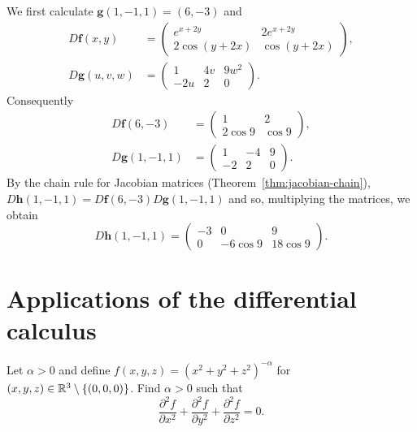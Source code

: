 \begin{solution}
    We first calculate \(\mathbf{g}(1,-1,1) = (6,-3)\) and
    \[
        \begin{aligned}
            D\mathbf{f}(x,y)   & =
            \begin{pmatrix}
                e^{x+2y}     & 2 e^{x+2y} \\
                2 \cos(y+2x) & \cos(y+2x)
            \end{pmatrix}, \\
            D\mathbf{g}(u,v,w) & =
            \begin{pmatrix}
                1   & 4v & 9w^2 \\
                -2u & 2  & 0
            \end{pmatrix}.
        \end{aligned}
    \]
    Consequently
    \[
        \begin{aligned}
            D\mathbf{f}(6,-3)   & =
            \begin{pmatrix}
                1        & 2      \\
                2 \cos 9 & \cos 9
            \end{pmatrix}, \\
            D\mathbf{g}(1,-1,1) & =
            \begin{pmatrix}
                1  & -4 & 9 \\
                -2 & 2  & 0
            \end{pmatrix}.
        \end{aligned}
    \]
    By the chain rule for Jacobian matrices (Theorem~\ref{thm:jacobian-chain}),
    \( D\mathbf{h}(1,-1,1) = D\mathbf{f}(6,-3)  D\mathbf{g}(1,-1,1) \)
    and so, multiplying the matrices, we obtain
    $$D\mathbf{h}(1,-1,1) =
        \begin{pmatrix}
            -3 & 0        & 9        \\
            0  & -6\cos 9 & 18\cos 9
        \end{pmatrix}.
    $$
\end{solution}


\section{Applications of the differential calculus}

\begin{task}
    Let \(\alpha>0\) and define \(f(x,y,z) = {(x^2 + y^2 + z^2)}^{-\alpha}\) for \((x,y,z)\in \mathbb{R}^3 \setminus \{(0,0,0)\}\).
    Find \(\alpha>0\) such that
    \[
        \frac{\partial^2 f}{\partial x^2} + \frac{\partial^2 f}{\partial y^2}  +\frac{\partial^2 f}{\partial z^2}  =0.
    \]
\end{task}

